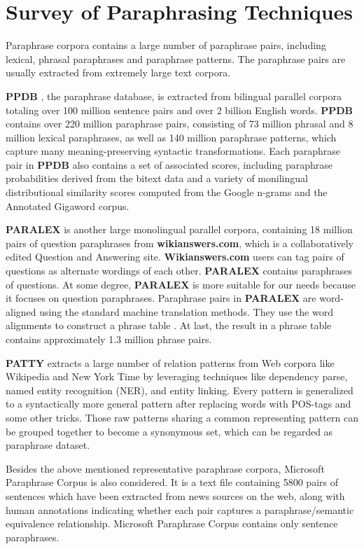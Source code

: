 \section{Survey of Paraphrasing Techniques}


Paraphrase corpora contains a large number of paraphrase pairs, including lexical, phrasal paraphrases and paraphrase patterns. The paraphrase pairs are usually extracted from extremely large text corpora.

\textbf{PPDB} \cite{ganitkevitch2013ppdb}, the paraphrase database, is extracted from bilingual parallel corpora totaling over 100 million sentence pairs and over 2 billion English words. \textbf{PPDB} contains over 220 million paraphrase pairs, consisting of 73 million phrasal and 8 million lexical paraphrases, as well as 140 million paraphrase patterns, which capture many meaning-preserving syntactic transformations. Each paraphrase pair in \textbf{PPDB} also contains a set of associated scores, including paraphrase probabilities derived from the bitext data and a variety of monilingual distributional similarity scores computed from the Google n-grams and the Annotated Gigaword corpus.

\textbf{PARALEX} \cite{fader2013paraphrase} is another large monolingual parallel corpora, containing 18 million pairs of question paraphrases from \textbf{wikianswers.com}, which is a collaboratively edited Question and Answering site. \textbf{Wikianswers.com} users can tag pairs of questions as alternate wordings of each other. \textbf{PARALEX} contains paraphrases of questions. At some degree, \textbf{PARALEX} is more suitable for our needs because it focuses on question paraphrases. Paraphrase pairs in \textbf{PARALEX} are word-aligned using the standard machine translation methods. They use the word alignments to construct a phrase table \cite{berant2014semantic}. At last, the result in a phrase table contains approximately 1.3 million phrase pairs.

\textbf{PATTY} \cite{nakashole2012patty} extracts a large number of relation patterns from Web corpora like Wikipedia and New York Time by leveraging techniques like dependency parse, named entity recognition (NER), and entity linking. Every pattern is generalized to a syntactically more general pattern after replacing words with POS-tags and some other tricks. Those raw patterns sharing a common representing pattern can be grouped together to become a synonymous set, which can be regarded as paraphrase dataset.

Besides the above mentioned representative paraphrase corpora, Microsoft Paraphrase Corpus \cite{automatically-constructing-a-corpus-of-sentential-paraphrases} is also considered. It is a text file containing 5800 pairs of sentences which have been extracted from news sources on the web, along with human annotations indicating whether each pair captures a paraphrase/semantic equivalence relationship. Microsoft Paraphrase Corpus contains only sentence paraphrases.
